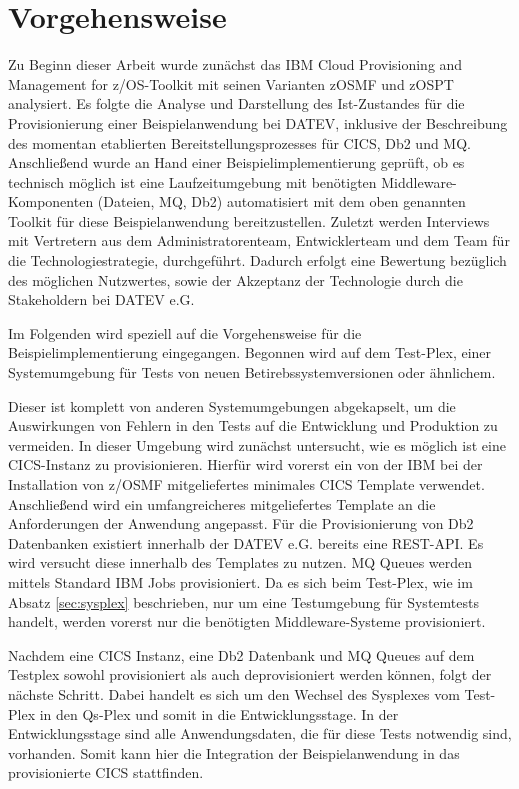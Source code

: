 \chapter{Vorgehensweise}\label{ch:vorgehensweise}
Zu Beginn dieser Arbeit wurde zunächst das \glqq IBM Cloud Provisioning and Management for z/OS\grqq-Toolkit mit seinen Varianten zOSMF und zOSPT analysiert.
Es folgte die Analyse und Darstellung des Ist-Zustandes für die  Provisionierung einer Beispielanwendung bei DATEV, inklusive der Beschreibung des momentan etablierten Bereitstellungsprozesses für CICS, Db2 und MQ.
Anschließend wurde an Hand einer Beispielimplementierung geprüft, ob es technisch möglich ist eine Laufzeitumgebung mit benötigten Middleware-Komponenten (Dateien, MQ, Db2) automatisiert mit dem oben genannten Toolkit für diese Beispielanwendung bereitzustellen.
Zuletzt werden Interviews mit Vertretern aus dem Administratorenteam, Entwicklerteam und dem Team für die Technologiestrategie, durchgeführt.
Dadurch erfolgt eine Bewertung bezüglich des möglichen Nutzwertes, sowie der Akzeptanz der Technologie durch die Stakeholdern bei DATEV e.G.

Im Folgenden wird speziell auf die Vorgehensweise für die Beispielimplementierung eingegangen. 
Begonnen wird auf dem Test-Plex, einer Systemumgebung für Tests von neuen Betirebssystemversionen oder ähnlichem.

Dieser ist komplett von anderen Systemumgebungen abgekapselt, um die Auswirkungen von Fehlern in den Tests auf die Entwicklung und Produktion zu vermeiden.
In dieser Umgebung wird zunächst untersucht, wie es möglich ist eine CICS-Instanz zu provisionieren.
Hierfür wird vorerst ein von der IBM bei der Installation von z/OSMF mitgeliefertes minimales CICS Template verwendet.
Anschließend wird ein umfangreicheres mitgeliefertes Template an die Anforderungen der Anwendung angepasst.
Für die Provisionierung von Db2 Datenbanken existiert innerhalb der DATEV e.G. bereits eine REST-API.
Es wird versucht diese innerhalb des Templates zu nutzen.
MQ Queues werden mittels Standard IBM Jobs provisioniert.
Da es sich beim Test-Plex, wie im Absatz \ref{sec:sysplex} beschrieben, nur um eine Testumgebung für Systemtests handelt, werden vorerst nur die benötigten Middleware-Systeme provisioniert.

Nachdem eine CICS Instanz, eine Db2 Datenbank und MQ Queues auf dem Testplex sowohl provisioniert als auch deprovisioniert werden können, folgt der nächste Schritt.
Dabei handelt es sich um den Wechsel des Sysplexes vom Test-Plex in den Qs-Plex und somit in die Entwicklungsstage.
In der Entwicklungsstage sind alle Anwendungsdaten, die für diese Tests notwendig sind, vorhanden.
Somit kann hier die Integration der Beispielanwendung in das provisionierte CICS stattfinden.


